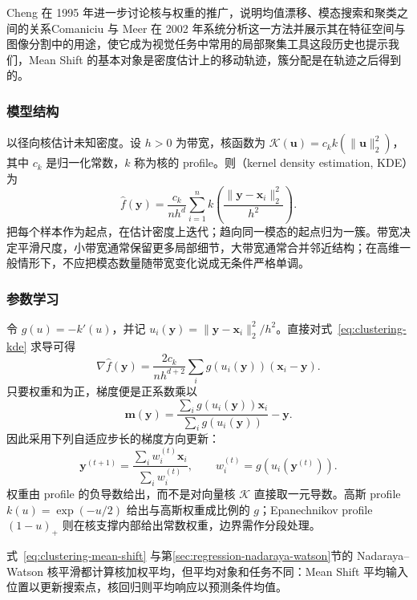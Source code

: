 Cheng 在 1995 年进一步讨论核与权重的推广，说明均值漂移、模态搜索和聚类之间的关系Comaniciu 与 Meer 在 2002 年系统分析这一方法并展示其在特征空间与图像分割中的用途，使它成为视觉任务中常用的局部聚集工具这段历史也提示我们，Mean Shift 的基本对象是密度估计上的移动轨迹，簇分配是在轨迹之后得到的。

\subsubsection{模型结构}

以径向核估计未知密度。设 $h>0$ 为带宽，核函数为 $\mathcal{K}(\bm{u})=c_k k(\lVert\bm{u}\rVert_2^2)$，其中 $c_k$ 是归一化常数，$k$ 称为核的 profile。则（kernel density estimation, KDE）为
\begin{equation}
 \hat f(\bm{y})=\frac{c_k}{nh^d}
 \sum_{i=1}^n
 k\left(\frac{\lVert\bm{y}-\bm{x}_i\rVert_2^2}{h^2}\right).
 \label{eq:clustering-kde}
\end{equation}
把每个样本作为起点，在估计密度上迭代；趋向同一模态的起点归为一簇。带宽决定平滑尺度，小带宽通常保留更多局部细节，大带宽通常合并邻近结构；在高维一般情形下，不应把模态数量随带宽变化说成无条件严格单调。

\subsubsection{参数学习}

令 $g(u)=-k'(u)$，并记 $u_i(\bm{y})=\lVert\bm{y}-\bm{x}_i\rVert_2^2/h^2$。直接对式~\eqref{eq:clustering-kde} 求导可得
\[
 \nabla\hat f(\bm{y})=
 \frac{2c_k}{nh^{d+2}}
 \sum_i g(u_i(\bm{y}))(\bm{x}_i-\bm{y}).
\]
只要权重和为正，梯度便是正系数乘以
\[
 \bm{m}(\bm{y})=
 \frac{\sum_i g(u_i(\bm{y}))\bm{x}_i}
      {\sum_i g(u_i(\bm{y}))}-\bm{y}.
\]
因此采用下列自适应步长的梯度方向更新：
\begin{equation}
 \bm{y}^{(t+1)}=
 \frac{\sum_i w_i^{(t)}\bm{x}_i}{\sum_i w_i^{(t)}},
 \qquad w_i^{(t)}=g(u_i(\bm{y}^{(t)})).
 \label{eq:clustering-mean-shift}
\end{equation}
权重由 profile 的负导数给出，而不是对向量核 $\mathcal{K}$ 直接取一元导数。高斯 profile $k(u)=\exp(-u/2)$ 给出与高斯权重成比例的 $g$；Epanechnikov profile $(1-u)_+$ 则在核支撑内部给出常数权重，边界需作分段处理。

式~\eqref{eq:clustering-mean-shift} 与第\ref{sec:regression-nadaraya-watson}节的 Nadaraya--Watson 核平滑都计算核加权平均，但平均对象和任务不同：Mean Shift 平均输入位置以更新搜索点，核回归则平均响应以预测条件均值。

